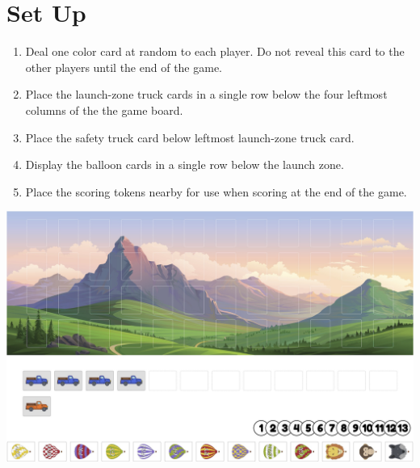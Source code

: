 \documentclass[a6paper, 11pt, parskip=half, DIV=15]{scrartcl}
\begin{document}
\newpage
\enlargethispage{1.75\baselineskip}
\section*{Set Up}
\begin{enumerate}

  \item Deal one color card at random to each player.
  Do not reveal this card to the other players until the end of the game.

 
  \item Place the launch-zone truck cards in a single row below the four leftmost columns of the the game board.%

  \item Place the safety truck card below leftmost launch-zone truck card.


  \item Display the balloon cards in a single row below the launch zone. 

  \item Place the scoring tokens nearby for use when scoring at the end of the game.
\end{enumerate}
\begin{center}
\includegraphics[scale=0.105]{set_up_diagram.jpg}
\end{center}
\end{document}
